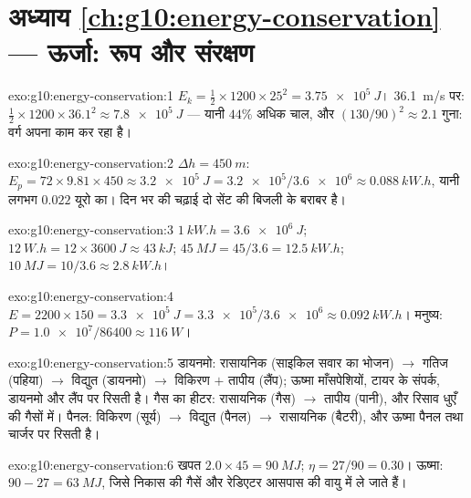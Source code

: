 \section*{अध्याय \ref{ch:g10:energy-conservation} --- ऊर्जा: रूप और संरक्षण}

\begin{solution}{exo:g10:energy-conservation:1}
$E_k = \tfrac12 \times 1200 \times 25^2 = \qty{3.75e5}{J}$। \qty{36.1}{m/s} पर: $\tfrac12 \times 1200 \times 36.1^2 \approx
\qty{7.8e5}{J}$ --- यानी $44\%$ अधिक चाल, और 
$(130/90)^2 \approx 2.1$ गुना: वर्ग अपना काम कर रहा है।
\end{solution}

\begin{solution}{exo:g10:energy-conservation:2}
$\Delta h = \qty{450}{m}$: $E_p = 72 \times 9.81 \times 450 \approx \qty{3.2e5}{J}
= \num{3.2e5}/\num{3.6e6} \approx \qty{0.088}{kW.h}$, यानी लगभग $0.022$ यूरो का। दिन भर की चढ़ाई दो सेंट की
बिजली के बराबर है।
\end{solution}

\begin{solution}{exo:g10:energy-conservation:3}
$\qty{1}{kW.h} = \qty{3.6e6}{J}$; $\qty{12}{W.h} = 12 \times \qty{3600}{J} \approx \qty{43}{kJ}$; $\qty{45}{MJ} = 45/3.6 = \qty{12.5}{kW.h}$; $\qty{10}{MJ} = 10/3.6 \approx \qty{2.8}{kW.h}$।
\end{solution}

\begin{solution}{exo:g10:energy-conservation:4}
$E = 2200 \times 150 = \qty{3.3e5}{J}
= \num{3.3e5}/\num{3.6e6} \approx \qty{0.092}{kW.h}$। मनुष्य: $P = \num{1.0e7}/\num{86400} \approx \qty{116}{W}$।
\end{solution}

\begin{solution}{exo:g10:energy-conservation:5}
डायनमो: रासायनिक (साइकिल सवार का भोजन) $\to$ गतिज (पहिया) $\to$
विद्युत (डायनमो) $\to$ विकिरण $+$ तापीय (लैंप); ऊष्मा माँसपेशियों,
टायर के संपर्क, डायनमो और लैंप पर रिसती है। गैस का हीटर: रासायनिक (गैस)
$\to$ तापीय (पानी), और रिसाव धुएँ की गैसों में। पैनल: विकिरण (सूर्य)
$\to$ विद्युत (पैनल) $\to$ रासायनिक (बैटरी), और ऊष्मा पैनल तथा चार्जर
पर रिसती है।
\end{solution}

\begin{solution}{exo:g10:energy-conservation:6}
खपत $2.0 \times 45 = \qty{90}{MJ}$; $\eta = 27/90 = 0.30$। ऊष्मा: $90 - 27 = \qty{63}{MJ}$, जिसे निकास की गैसें और रेडिएटर
आसपास की वायु में ले जाते हैं।
\end{solution}

